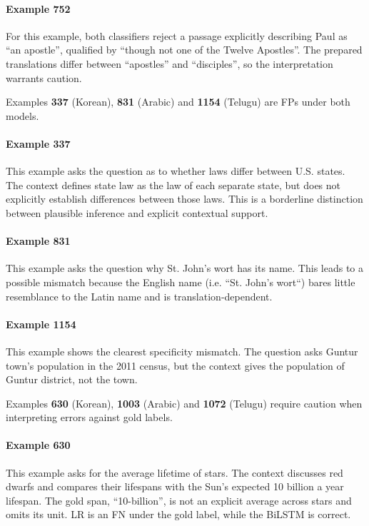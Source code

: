 \documentclass[11pt]{article}
\begin{document}
\paragraph{Example 752} 
For this example, both classifiers reject a passage explicitly describing Paul as ``an apostle'', qualified by ``though not one of the Twelve Apostles''. The prepared translations differ between ``apostles'' and ``disciples'', so the interpretation warrants caution.

Examples \textbf{337} (Korean), \textbf{831} (Arabic) and \textbf{1154} (Telugu)
are FPs under both models.

\paragraph{Example 337} 
This example asks the question as to whether laws differ between U.S. states. The context defines state law as the law of each separate state, but does not explicitly establish differences between those laws. This is a borderline distinction between plausible inference and explicit contextual support.

\paragraph{Example 831} 
This example asks the question why St. John's wort has its name. This leads to a possible mismatch because the English name (i.e. ``St. John's wort``) bares little resemblance to the Latin name and is translation-dependent.

\paragraph{Example 1154}
This example shows the clearest specificity mismatch. The question asks Guntur town's population in the 2011 census, but the context gives the population of Guntur district, not the town.

\noindent
Examples \textbf{630} (Korean), \textbf{1003} (Arabic) and \textbf{1072} (Telugu) require caution when interpreting errors against gold labels.


\paragraph{Example 630} 
This example asks for the average lifetime of stars. The context discusses red dwarfs and compares their lifespans with the Sun's expected 10 billion a year lifespan. The gold span, ``10-billion'', is not an explicit average across stars and omits its unit. LR is an FN under the gold label, while the BiLSTM is correct.
\end{document}
